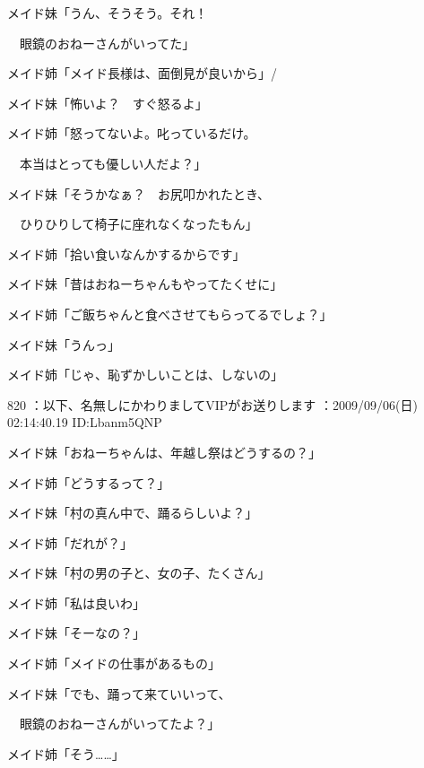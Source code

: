 \documentclass[a4j,twocolumn]{tarticle}
\begin{document}
メイド妹「うん、そうそう。それ！\par{} 
　眼鏡のおねーさんがいってた」 



メイド姉「メイド長様は、面倒見が良いから」/

 



メイド妹「怖いよ？　すぐ怒るよ」 



メイド姉「怒ってないよ。叱っているだけ。\par{} 
　本当はとっても優しい人だよ？」

 



メイド妹「そうかなぁ？　お尻叩かれたとき、\par{} 
　ひりひりして椅子に座れなくなったもん」 



メイド姉「拾い食いなんかするからです」 



メイド妹「昔はおねーちゃんもやってたくせに」\par{} 
メイド姉「ご飯ちゃんと食べさせてもらってるでしょ？」 



メイド妹「うんっ」\par{}
メイド姉「じゃ、恥ずかしいことは、しないの」 

	
    
    

820 ：以下、名無しにかわりましてVIPがお送りします ：2009/09/06(日) 02:14:40.19 ID:Lbanm5QNP 


メイド妹「おねーちゃんは、年越し祭はどうするの？」\par{} 
メイド姉「どうするって？」 



メイド妹「村の真ん中で、踊るらしいよ？」\par{} 
メイド姉「だれが？」 



メイド妹「村の男の子と、女の子、たくさん」\par{} 
メイド姉「私は良いわ」 



メイド妹「そーなの？」\par{} 
メイド姉「メイドの仕事があるもの」 



メイド妹「でも、踊って来ていいって、\par{} 
　眼鏡のおねーさんがいってたよ？」\par{} 
メイド姉「そう……」 
\end{document}
